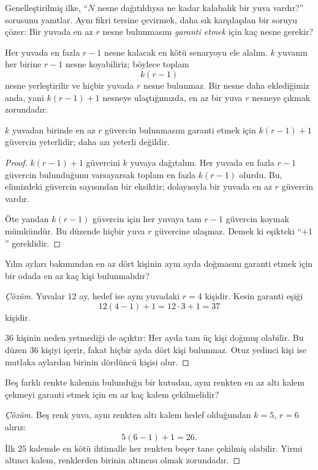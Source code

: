 Genelleştirilmiş ilke, ``$N$ nesne dağıtıldıysa ne kadar kalabalık bir yuva vardır?'' sorusunu yanıtlar. Aynı fikri tersine çevirmek, daha sık karşılaşılan bir soruyu çözer: Bir yuvada en az $r$ nesne bulunmasını \emph{garanti etmek} için kaç nesne gerekir?

Her yuvada en fazla $r-1$ nesne kalacak en kötü senaryoyu ele alalım. $k$ yuvanın her birine $r-1$ nesne koyabiliriz; böylece toplam
\[
k(r-1)
\]
nesne yerleştirilir ve hiçbir yuvada $r$ nesne bulunmaz. Bir nesne daha eklediğimiz anda, yani $k(r-1)+1$ nesneye ulaştığımızda, en az bir yuva $r$ nesneye çıkmak zorundadır.

\begin{theorem}
$k$ yuvadan birinde en az $r$ güvercin bulunmasını garanti etmek için $k(r-1)+1$ güvercin yeterlidir; daha azı yeterli değildir.
\end{theorem}

\begin{proof}
$k(r-1)+1$ güvercini $k$ yuvaya dağıtalım. Her yuvada en fazla $r-1$ güvercin bulunduğunu varsayarsak toplam en fazla $k(r-1)$ olurdu. Bu, elimizdeki güvercin sayısından bir eksiktir; dolayısıyla bir yuvada en az $r$ güvercin vardır.

Öte yandan $k(r-1)$ güvercin için her yuvaya tam $r-1$ güvercin koymak mümkündür. Bu düzende hiçbir yuva $r$ güvercine ulaşmaz. Demek ki eşikteki ``$+1$'' gereklidir.
\end{proof}

\begin{example}
Yılın ayları bakımından en az dört kişinin aynı ayda doğmasını garanti etmek için bir odada en az kaç kişi bulunmalıdır?
\end{example}
\begin{proof}[Çözüm]
Yuvalar $12$ ay, hedef ise aynı yuvadaki $r=4$ kişidir. Kesin garanti eşiği
\[
12(4-1)+1=12\cdot3+1=37
\]
kişidir.

$36$ kişinin neden yetmediği de açıktır: Her ayda tam üç kişi doğmuş olabilir. Bu düzen $36$ kişiyi içerir, fakat hiçbir ayda dört kişi bulunmaz. Otuz yedinci kişi ise mutlaka aylardan birinin dördüncü kişisi olur.
\end{proof}

\begin{example}
Beş farklı renkte kalemin bulunduğu bir kutudan, aynı renkten en az altı kalem çekmeyi garanti etmek için en az kaç kalem çekilmelidir?
\end{example}
\begin{proof}[Çözüm]
Beş renk yuva, aynı renkten altı kalem hedef olduğundan $k=5$, $r=6$ alırız:
\[
5(6-1)+1=26.
\]
İlk $25$ kalemde en kötü ihtimalle her renkten beşer tane çekilmiş olabilir. Yirmi altıncı kalem, renklerden birinin altıncısı olmak zorundadır.
\end{proof}

